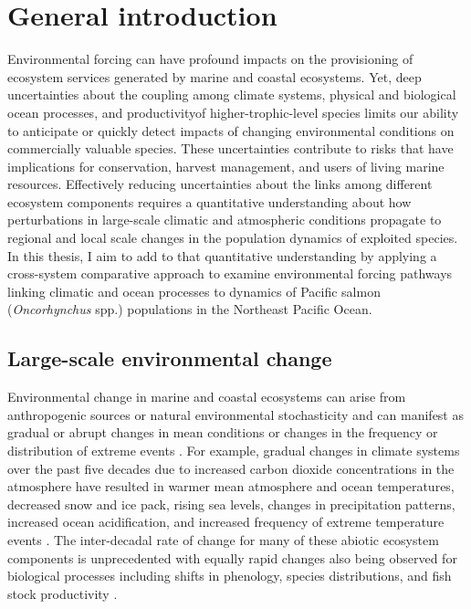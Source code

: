 
\chapter[General introduction]{General introduction}
\label{ch:intro}

Environmental forcing can have profound impacts on the provisioning of ecosystem
services generated by marine and coastal ecosystems. Yet, deep uncertainties
about the coupling among climate systems, physical and biological ocean
processes, and productivity\footnotemark[1] of higher-trophic-level species
limits our ability to anticipate or quickly detect impacts of changing
environmental conditions on commercially valuable species. These uncertainties
contribute to risks that have implications for conservation, harvest management,
and users of living marine resources. Effectively reducing uncertainties about
the links among different ecosystem components requires a quantitative
understanding about how perturbations in large-scale climatic and atmospheric
conditions propagate to regional and local scale changes in the population
dynamics of exploited species. In this thesis, I aim to add to that quantitative
understanding by applying a cross-system comparative approach to examine
environmental forcing pathways linking climatic and ocean processes to dynamics
of Pacific salmon (\emph{Oncorhynchus} spp.) populations in the Northeast
Pacific Ocean.



\section{Large-scale environmental change}

Environmental change in marine and coastal ecosystems can arise from
anthropogenic sources or natural environmental stochasticity and can manifest as
gradual or abrupt changes in mean conditions or changes in the frequency or
distribution of extreme events \citep{Jentsch2007}. For example, gradual changes
in climate systems over the past five decades due to increased carbon dioxide
concentrations in the atmosphere have resulted in warmer mean atmosphere and
ocean temperatures, decreased snow and ice pack, rising sea levels, changes in
precipitation patterns, increased ocean acidification, and increased frequency
of extreme temperature events \citep{IPCC2013a}. The inter-decadal rate of
change for many of these abiotic ecosystem components is unprecedented with
equally rapid changes also being observed for biological processes including
shifts in phenology, species distributions, and fish stock productivity
\citep{IPCC2013a, Taylor2008a, Pinsky2013, Peterman2012}.

